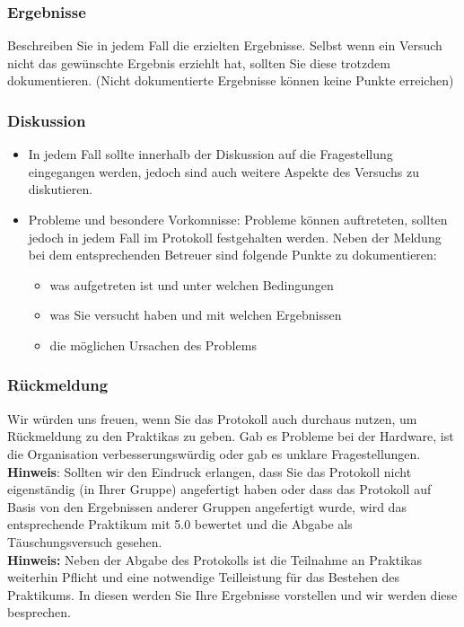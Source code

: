 \subsubsection{Ergebnisse}
Beschreiben Sie in jedem Fall die erzielten Ergebnisse. Selbst wenn ein Versuch nicht das gewünschte Ergebnis erziehlt hat, sollten Sie diese trotzdem dokumentieren. (Nicht dokumentierte Ergebnisse können keine Punkte erreichen)

\subsubsection{Diskussion}
\begin{itemize}
	\item In jedem Fall sollte innerhalb der Diskussion auf die Fragestellung eingegangen werden, jedoch sind auch weitere Aspekte des Versuchs zu diskutieren.
	\newpage
	\item Probleme und besondere Vorkomnisse: Probleme können auftreteten, sollten jedoch in jedem Fall im Protokoll festgehalten werden. Neben der Meldung bei dem entsprechenden Betreuer sind folgende Punkte zu dokumentieren:
	\begin{itemize}
		\item was aufgetreten ist und unter welchen Bedingungen
		\item was Sie versucht haben und mit welchen Ergebnissen
		\item die möglichen Ursachen des Problems
	\end{itemize}
\end{itemize}

\subsubsection{Rückmeldung}
Wir würden uns freuen, wenn Sie das Protokoll auch durchaus nutzen, um Rückmeldung zu den Praktikas zu geben. Gab es Probleme bei der Hardware, ist die Organisation verbesserungswürdig oder gab es unklare Fragestellungen. \\

\textbf{Hinweis}: Sollten wir den Eindruck erlangen, dass Sie das Protokoll nicht eigenständig (in Ihrer Gruppe) angefertigt haben oder dass das Protokoll auf Basis von den Ergebnissen anderer Gruppen angefertigt wurde, wird das entsprechende Praktikum mit 5.0 bewertet und die Abgabe als Täuschungsversuch gesehen.
\\

\textbf{Hinweis:} Neben der Abgabe des Protokolls ist die Teilnahme an Praktikas weiterhin Pflicht und eine notwendige Teilleistung für das Bestehen des Praktikums. In diesen werden Sie Ihre Ergebnisse vorstellen und wir werden diese besprechen.